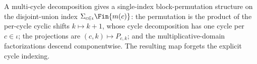 \begin{definition}
    \label{def:multi_cycle_to_cycle_structure}
    \leanok
    A multi-cycle decomposition gives a single-index block-permutation
    structure on the disjoint-union index
    $\Sigma_{c\in\iota}\Fin{m(c)}$: the permutation is the product of the
    per-cycle cyclic shifts $k\mapsto k+1$, whose cycle decomposition has
    one cycle per $c\in\iota$; the projections are
    $(c,k)\mapsto P_{c,k}$; and the multiplicative-domain factorizations
    descend componentwise. The resulting map forgets the explicit cycle
    indexing.
\end{definition}
